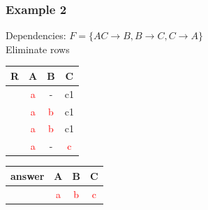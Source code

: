 \documentclass{beamer}
\begin{document}
\begin{frame}
  \frametitle{Example 2}
  Dependencies: $F = \{AC \rightarrow B, B \rightarrow C, C \rightarrow A \}$\\
  Eliminate rows\\
  \begin{tabular}{ c | c c c}
  R & A & B & C \\
  \hline
  & \textcolor{red}{a}  & -  & c1 \\
  & \textcolor{red}{a}  & \textcolor{red}{b}  & c1 \\
  & \textcolor{red}{a}  & \textcolor{red}{b} & c1 \\
  & \textcolor{red}{a}  & - & \textcolor{red}{c} \\
  \end{tabular}
  \begin{tabular}{ c | c c c}
  answer & A & B & C \\
  \hline
   & \textcolor{red}{a}& \textcolor{red}{b}& \textcolor{red}{c}\\
  \end{tabular}
\end{frame}
\end{document}
